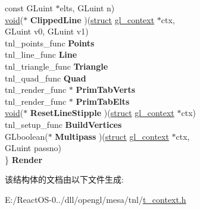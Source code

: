 \begin{DoxyCompactItemize}
\begin{tabbing}
\>\>const GLuint $\ast$elts, GLuint n)\\
\>\hyperlink{interfacevoid}{void}($\ast$ {\bfseries ClippedLine} )(\hyperlink{interfacestruct}{struct} \hyperlink{structgl__context}{gl\_context} $\ast$ctx, \\
\>\>GLuint v0, GLuint v1)\\
\>tnl\_points\_func {\bfseries Points}\\
\>tnl\_line\_func {\bfseries Line}\\
\>tnl\_triangle\_func {\bfseries Triangle}\\
\>tnl\_quad\_func {\bfseries Quad}\\
\>tnl\_render\_func $\ast$ {\bfseries PrimTabVerts}\\
\>tnl\_render\_func $\ast$ {\bfseries PrimTabElts}\\
\>\hyperlink{interfacevoid}{void}($\ast$ {\bfseries ResetLineStipple} )(\hyperlink{interfacestruct}{struct} \hyperlink{structgl__context}{gl\_context} $\ast$ctx)\\
\>tnl\_setup\_func {\bfseries BuildVertices}\\
\>GLboolean($\ast$ {\bfseries Multipass} )(\hyperlink{interfacestruct}{struct} \hyperlink{structgl__context}{gl\_context} $\ast$ctx, \\
\>\>GLuint passno)\\
\} {\bfseries Render}\\

\end{tabbing}\end{DoxyCompactItemize}


该结构体的文档由以下文件生成\+:\begin{DoxyCompactItemize}
\item 
E\+:/\+React\+O\+S-\/0../dll/opengl/mesa/tnl/\hyperlink{t__context_8h}{t\+\_\+context.\+h}\end{DoxyCompactItemize}

